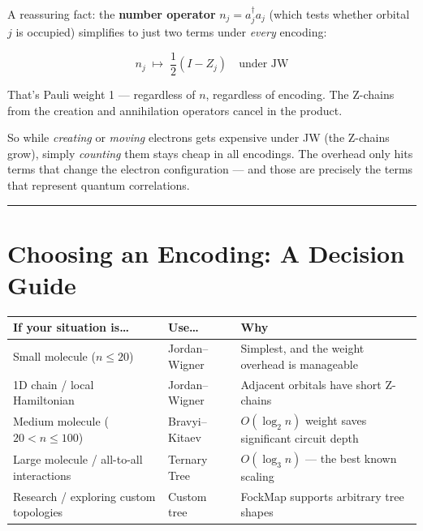 \documentclass[
  11pt,
  oneside]{book}
\begin{document}
A reassuring fact: the \textbf{number operator}
\(n_j = a_j^\dagger a_j\) (which tests whether orbital \(j\) is
occupied) simplifies to just two terms under \emph{every} encoding:

\[n_j \;\mapsto\; \frac{1}{2}(I - Z_j) \quad \text{under JW}\]

That's Pauli weight 1 --- regardless of \(n\), regardless of encoding.
The Z-chains from the creation and annihilation operators cancel in the
product.

So while \emph{creating} or \emph{moving} electrons gets expensive under
JW (the Z-chains grow), simply \emph{counting} them stays cheap in all
encodings. The overhead only hits terms that change the electron
configuration --- and those are precisely the terms that represent
quantum correlations.

\begin{center}\rule{0.5\linewidth}{0.5pt}\end{center}

\section{Choosing an Encoding: A Decision
Guide}\label{choosing-an-encoding-a-decision-guide}

\begin{longtable}[]{@{}
  >{\raggedright\arraybackslash}p{}
  >{\raggedright\arraybackslash}p{}
  >{\raggedright\arraybackslash}p{}@{}}
\toprule\noalign{}
\begin{minipage}[b]{\linewidth}\raggedright
If your situation is\ldots{}
\end{minipage} & \begin{minipage}[b]{\linewidth}\raggedright
Use\ldots{}
\end{minipage} & \begin{minipage}[b]{\linewidth}\raggedright
Why
\end{minipage} \\
\midrule\noalign{}
\endhead
\bottomrule\noalign{}
\endlastfoot
Small molecule (\(n \leq 20\)) & Jordan--Wigner & Simplest, and the
weight overhead is manageable \\
1D chain / local Hamiltonian & Jordan--Wigner & Adjacent orbitals have
short Z-chains \\
Medium molecule (\(20 < n \leq 100\)) & Bravyi--Kitaev & \(O(\log_2 n)\)
weight saves significant circuit depth \\
Large molecule / all-to-all interactions & Ternary Tree &
\(O(\log_3 n)\) --- the best known scaling \\
Research / exploring custom topologies & Custom tree & FockMap supports
arbitrary tree shapes \\
\end{longtable}
\end{document}
